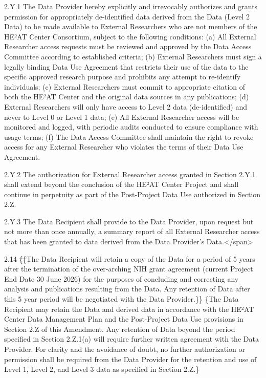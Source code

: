 \documentclass[12pt,letterpaper]{article}
\newcommand{\deleted}[1]{\textcolor{deletecolor}{\sout{#1}}}
\newcommand{\added}[1]{\textcolor{addcolor}{#1}}
\begin{document}
2.Y.1 The Data Provider hereby explicitly and irrevocably authorizes and grants permission for appropriately de-identified data derived from the Data (Level 2 Data) to be made available to External Researchers who are not members of the HE²AT Center Consortium, subject to the following conditions: (a) All External Researcher access requests must be reviewed and approved by the Data Access Committee according to established criteria; (b) External Researchers must sign a legally binding Data Use Agreement that restricts their use of the data to the specific approved research purpose and prohibits any attempt to re-identify individuals; (c) External Researchers must commit to appropriate citation of both the HE²AT Center and the original data sources in any publications; (d) External Researchers will only have access to Level 2 data (de-identified) and never to Level 0 or Level 1 data; (e) All External Researcher access will be monitored and logged, with periodic audits conducted to ensure compliance with usage terms; (f) The Data Access Committee shall maintain the right to revoke access for any External Researcher who violates the terms of their Data Use Agreement.

2.Y.2 The authorization for External Researcher access granted in Section 2.Y.1 shall extend beyond the conclusion of the HE²AT Center Project and shall continue in perpetuity as part of the Post-Project Data Use authorized in Section 2.Z.

2.Y.3 The Data Recipient shall provide to the Data Provider, upon request but not more than once annually, a summary report of all External Researcher access that has been granted to data derived from the Data Provider's Data.</span>

2.14	\deleted\{\deleted\{The Data Recipient will retain a copy of the Data for a period of 5 years after the termination of the over-arching NIH grant agreement (current Project End Date 30 June 2026) for the purposes of concluding and correcting any analysis and publications resulting from the Data.  Any retention of Data after this 5 year period will be negotiated with the Data Provider.\}\} \added\{The Data Recipient may retain the Data and derived data in accordance with the HE²AT Center Data Management Plan and the Post-Project Data Use provisions in Section 2.Z of this Amendment. Any retention of Data beyond the period specified in Section 2.Z.1(a) will require further written agreement with the Data Provider. For clarity and the avoidance of doubt, no further authorization or permission shall be required from the Data Provider for the retention and use of Level 1, Level 2, and Level 3 data as specified in Section 2.Z.\}
\end{document}
